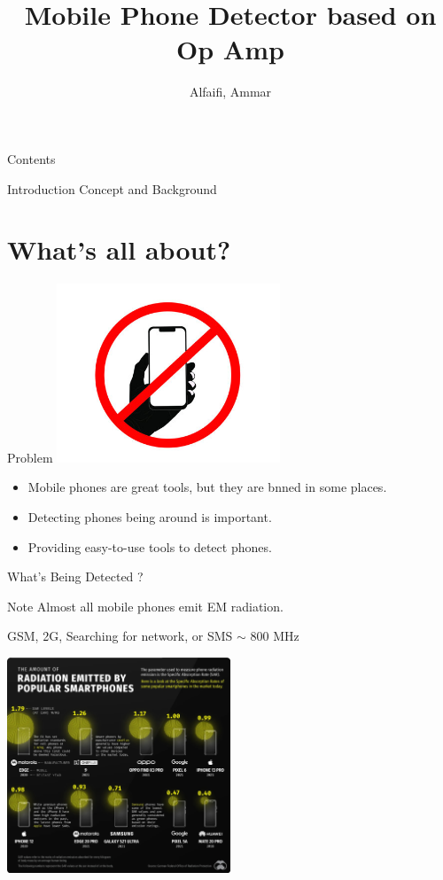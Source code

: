 \documentclass{loyola-beamer}
\title{Mobile Phone Detector based on Op Amp}
\author{Alfaifi, Ammar}
\institute{KFUPM}
\begin{document}
\begin{titleframe}{}
	\maketitle
\end{titleframe}

\begin{frame}{Contents}
	\tableofcontents
\end{frame}



\begin{titleframe}{Introduction}
	Concept and Background
\end{titleframe}

\section{What's all about?}

\begin{frame}{Problem}
	\includegraphics[width=0.5\textwidth]{../mobile-not-allowed.jpg}
	\begin{itemize}
		\item Mobile phones are great tools, but they are bnned in some places.
		\item Detecting phones being around is important.
		\item Providing  easy-to-use tools to detect phones.
	\end{itemize}
\end{frame}

\begin{frame}{What's Being Detected ?}
	\begin{block}{Note}
		Almost all mobile phones emit EM radiation.
	\end{block}

	GSM, 2G, Searching for network, or SMS $\sim$ 800 MHz

	\includegraphics[width=0.5\textwidth]{../Radiation.jpg}
\end{frame}
\end{document}

